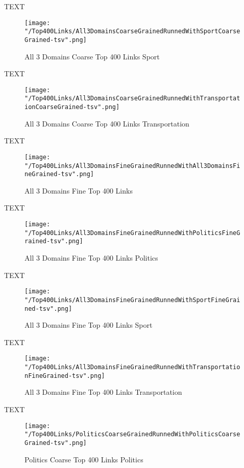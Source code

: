 \documentclass[thesis=M,english]{FITthesis}[2012/10/20]
\begin{document}
	TEXT	

	\begin{figure}\centering
		\texttt{[image: "/Top400Links/All3DomainsCoarseGrainedRunnedWithSportCoarseGrained-tsv".png]}
		\caption{All 3 Domains Coarse Top 400 Links Sport}\label{}
	\end{figure}
	
		TEXT	

	\begin{figure}\centering
		\texttt{[image: "/Top400Links/All3DomainsCoarseGrainedRunnedWithTransportationCoarseGrained-tsv".png]}
		\caption{All 3 Domains Coarse Top 400 Links Transportation}\label{}	
	\end{figure}
		
		TEXT	

	\begin{figure}\centering
		\texttt{[image: "/Top400Links/All3DomainsFineGrainedRunnedWithAll3DomainsFineGrained-tsv".png]}
		\caption{All 3 Domains Fine Top 400 Links }\label{}	
	\end{figure}
	
	TEXT

	\begin{figure}\centering
		\texttt{[image: "/Top400Links/All3DomainsFineGrainedRunnedWithPoliticsFineGrained-tsv".png]}
		\caption{All 3 Domains Fine Top 400 Links Politics}\label{}
	\end{figure}	

	TEXT	

	\begin{figure}\centering
		\texttt{[image: "/Top400Links/All3DomainsFineGrainedRunnedWithSportFineGrained-tsv".png]}
		\caption{All 3 Domains Fine Top 400 Links Sport}\label{}
	\end{figure}
	
		TEXT	

	\begin{figure}\centering
		\texttt{[image: "/Top400Links/All3DomainsFineGrainedRunnedWithTransportationFineGrained-tsv".png]}
		\caption{All 3 Domains Fine Top 400 Links Transportation}\label{}	
	\end{figure}
	
	TEXT

	\begin{figure}\centering
		\texttt{[image: "/Top400Links/PoliticsCoarseGrainedRunnedWithPoliticsCoarseGrained-tsv".png]}
		\caption{Politics Coarse Top 400 Links Politics}\label{}
	\end{figure}	
\end{document}
